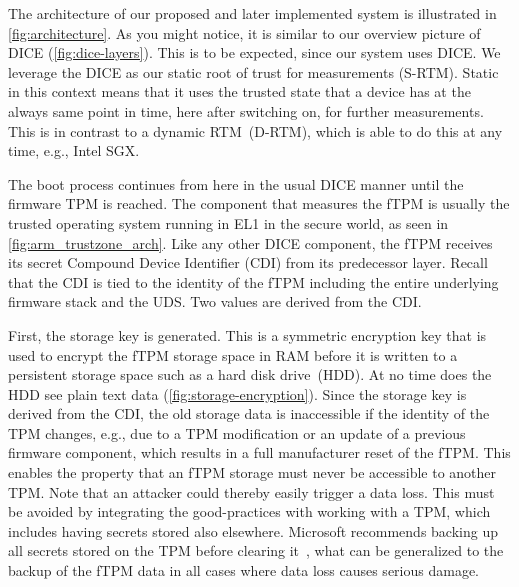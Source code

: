 The architecture of our proposed and later implemented system is illustrated in \autoref{fig:architecture}.
As you might notice, it is similar to our overview picture of DICE (\autoref{fig:dice-layers}).
This is to be expected, since our system uses DICE\@.
We leverage the DICE as our static root of trust for measurements (S-RTM).
Static in this context means that it uses the trusted state that a device has at the always same point in time, here after switching on, for further measurements.
This is in contrast to a dynamic RTM~(D-RTM), which is able to do this at any time, e.g., Intel SGX\@.

The boot process continues from here in the usual DICE manner until the firmware TPM is reached.
The component that measures the fTPM is usually the trusted operating system running in EL1 in the secure world, as seen in \autoref{fig:arm_trustzone_arch}.
Like any other DICE component, the fTPM receives its secret Compound Device Identifier (CDI) from its predecessor layer.
Recall that the CDI is tied to the identity of the fTPM including the entire underlying firmware stack and the UDS\@.
Two values are derived from the CDI\@.


First, the storage key is generated.
This is a symmetric encryption key that is used to encrypt the fTPM storage space in RAM before it is written to a persistent storage space such as a hard disk drive~(HDD).
At no time does the HDD see plain text data (\autoref{fig:storage-encryption}).
Since the storage key is derived from the CDI, the old storage data is inaccessible if the identity of the TPM changes, e.g., due to a TPM modification or an update of a previous firmware component, which results in a full manufacturer reset of the fTPM\@.
This enables the property that an fTPM storage must never be accessible to another TPM\@.
Note that an attacker could thereby easily trigger a data loss.
This must be avoided by integrating the good-practices with working with a \ac{TPM}, which includes having secrets stored also elsewhere.
Microsoft recommends backing up all secrets stored on the TPM before clearing it~\cite{MicrosoftClearRecommendations}, what can be generalized to the backup of the fTPM data in all cases where data loss causes serious damage.


